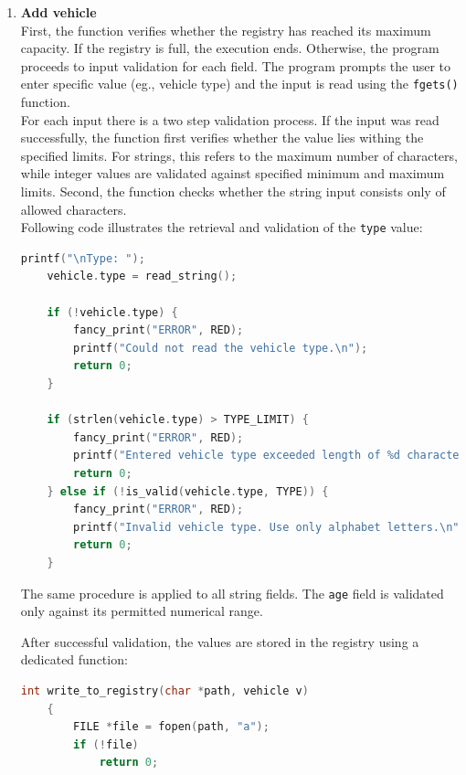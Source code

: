 \documentclass[12pt, a4paper]{article}
\begin{document}
\begin{enumerate}
  \item \textbf{Add vehicle} \\

  First, the function verifies whether the registry has reached its maximum capacity. If the registry is full, the execution ends. 
  Otherwise, the program proceeds to input validation for each field.
  The program prompts the user to enter specific value (eg., vehicle type) and the input is read using the \texttt{fgets()} function. \\

  For each input there is a two step validation process. If the input was read successfully, the function first verifies whether the value lies withing the specified limits.
  For strings, this refers to the maximum number of characters, while integer values are validated against specified minimum and maximum limits.
  Second, the function checks whether the string input consists only of allowed characters. \\

  Following code illustrates the retrieval and validation of the \texttt{type} value:

        \begin{lstlisting}[language=C, caption={Retrieving and validating vehicle data}]
    printf("\nType: ");
    vehicle.type = read_string();

    if (!vehicle.type) {
        fancy_print("ERROR", RED);
        printf("Could not read the vehicle type.\n");
        return 0;
    }

    if (strlen(vehicle.type) > TYPE_LIMIT) {
        fancy_print("ERROR", RED);
        printf("Entered vehicle type exceeded length of %d characters.\n", TYPE_LIMIT);
        return 0;
    } else if (!is_valid(vehicle.type, TYPE)) {
        fancy_print("ERROR", RED);
        printf("Invalid vehicle type. Use only alphabet letters.\n");
        return 0;
    }
    \end{lstlisting}
  
  The same procedure is applied to all string fields. The \texttt{age} field is validated only against its permitted numerical range.

  After successful validation, the values are stored in the registry using a dedicated function:

    \begin{lstlisting}[language=C, caption={Writing to the registry}]
    int write_to_registry(char *path, vehicle v)
    {
        FILE *file = fopen(path, "a");
        if (!file)
            return 0;
    

\end{lstlisting}
\end{enumerate}
\end{document}
